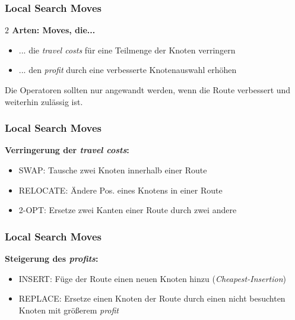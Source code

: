 \documentclass{beamer}
\begin{document}
\begin{frame}
  \frametitle{Local Search Moves}
  \textbf{$2$ Arten: Moves, die...}
  \begin{itemize}
    \item ... die \textit{travel costs} für eine Teilmenge der Knoten verringern
    \item ... den \textit{profit} durch eine verbesserte Knotenauswahl erhöhen
  \end{itemize}
  Die Operatoren sollten nur angewandt werden, wenn die Route verbessert und weiterhin zulässig ist.
\end{frame}

\begin{frame}
  \frametitle{Local Search Moves}
  \textbf{Verringerung der \textit{travel costs}:}
  \begin{itemize}
    \item \textsc{SWAP}: Tausche zwei Knoten innerhalb einer Route
    \item \textsc{RELOCATE}: Ändere Pos. eines Knotens in einer Route
    \item \textsc{2-OPT}: Ersetze zwei Kanten einer Route durch zwei andere
  \end{itemize}
\end{frame}

\begin{frame}
  \frametitle{Local Search Moves}
  \textbf{Steigerung des \textit{profits}:}
  \begin{itemize}
    \item \textsc{INSERT}: Füge der Route einen neuen Knoten hinzu (\textit{Cheapest-Insertion})
    \item \textsc{REPLACE}: Ersetze einen Knoten der Route durch einen nicht besuchten Knoten mit größerem \textit{profit}
  \end{itemize}
\end{frame}
\end{document}
